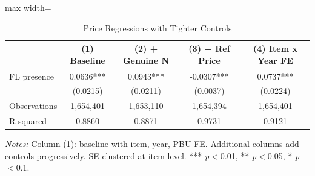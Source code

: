 \begin{table}[htbp]
\centering
\caption{Price Regressions with Tighter Controls}
\label{tab:tighter_controls}
\begin{adjustbox}{max width=\textwidth}
\begin{threeparttable}
\small
\begin{tabular}{lcccc}
\toprule
 & (1) Baseline & (2) + Genuine N & (3) + Ref Price & (4) Item x Year FE \\
\midrule
FL presence & 0.0636*** & 0.0943*** & -0.0307*** & 0.0737*** \\
 & (0.0215) & (0.0211) & (0.0037) & (0.0224) \\
\midrule
Observations & 1,654,401 & 1,653,110 & 1,654,394 & 1,654,401 \\
R-squared & 0.8860 & 0.8871 & 0.9731 & 0.9121 \\
\bottomrule
\end{tabular}
\begin{tablenotes}
\small
\item \textit{Notes:} Column (1): baseline with item, year, PBU FE. Additional columns add controls progressively. SE clustered at item level. *** \textit{p}$<$0.01, ** \textit{p}$<$0.05, * \textit{p}$<$0.1.
\end{tablenotes}
\end{threeparttable}
\end{adjustbox}
\end{table}
